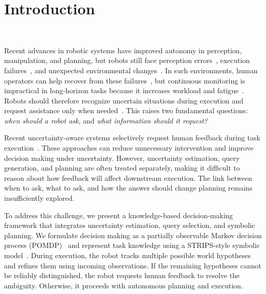 \section{Introduction}~\label{intro}

Recent advances in robotic systems have improved autonomy in perception, manipulation, and planning, but robots still face perception errors~\cite{kaipa2016addressing}, execution failures~\cite{kaelbling1998planning}, and unexpected environmental changes~\cite{kurniawati2016online}. In such environments, human operators can help recover from these failures~\cite{dragan2013legibility, goodrich2008human}, but continuous monitoring is impractical in long-horizon tasks because it increases workload and fatigue~\cite{chen2014human}. Robots should therefore recognize uncertain situations during execution and request assistance only when needed~\cite{sadigh2017active, leusmann2023understanding}. This raises two fundamental questions: \textit{when should a robot ask}, and \textit{what information should it request?}


Recent uncertainty-aware systems selectively request human feedback during task execution~\cite{ren2023robots, liang2024introspective, mullen2025lbap}. These approaches can reduce unnecessary intervention and improve decision making under uncertainty. However, uncertainty estimation, query generation, and planning are often treated separately, making it difficult to reason about how feedback will affect downstream execution. The link between when to ask, what to ask, and how the answer should change planning remains insufficiently explored.


To address this challenge, we present a knowledge-based decision-making framework that integrates uncertainty estimation, query selection, and symbolic planning. We formulate decision making as a partially observable Markov decision process (POMDP)~\cite{kaelbling1998planning} and represent task knowledge using a STRIPS-style symbolic model~\cite{davis1993knowledge,fikes1971strips}. During execution, the robot tracks multiple possible world hypotheses and refines them using incoming observations. If the remaining hypotheses cannot be reliably distinguished, the robot requests human feedback to resolve the ambiguity. Otherwise, it proceeds with autonomous planning and execution.




